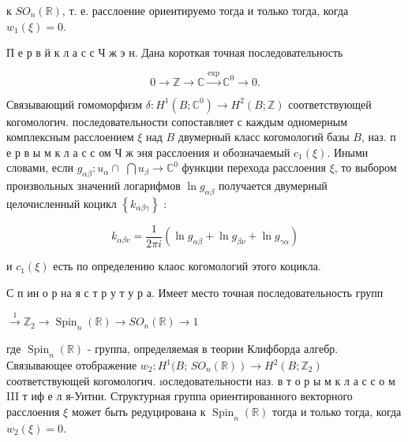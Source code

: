 \documentclass[10pt]{article}
\begin{document}
к $S O_{n}(\mathbb{R})$, т. е. расслоение ориентируемо тогда и только тогда, когда $w_{1}(\xi)=0$.



П е р в й к л а с с Ч ж э н. Дана короткая точная последовательность



\[

0 \longrightarrow \mathbb{Z} \longrightarrow \mathbb{C} \stackrel{\exp }{\longrightarrow} \mathbb{C}^{0} \longrightarrow 0 .

\]



Связывающий гомоморфизм $\delta: H^{1}\left(B ; \mathbb{C}^{0}\right) \rightarrow H^{2}(B ; \mathbb{Z})$ соответствующей когомологич. последовательности сопоставляет с каждым одномерным комплексным расслоением $\xi$ над $B$ двумерный класс когомологий базы $B$, наз. п е р в ы м к л а с с ом Ч ж эня расслоения и обозначаемый $c_{1}(\xi)$. Иными словами, если $g_{\alpha \beta}: u_{\alpha} \cap$ $\bigcap u_{\beta} \longrightarrow \mathbb{C}^{0}$ функции перехода расслоения $\xi$, то выбором произвольных значений логарифмов $\ln g_{\alpha \beta}$ получается двумерный целочисленный коцикл $\left\{k_{\alpha \beta \gamma}\right\}$ :



\[

k_{\alpha \beta v}=\frac{1}{2 \pi i}\left(\ln g_{\alpha \beta}+\ln g_{\beta \nu}+\ln g_{\gamma \alpha}\right)

\]



и $c_{1}(\xi)$ есть по определению клаос когомологий этого коцикла.



С п ин о р на я с т р у т у р а. Имеет место точная последовательность групп



$\stackrel{1}{\longrightarrow} \mathbb{Z}_{2} \longrightarrow \operatorname{Spin}_{n}(\mathbb{R}) \longrightarrow S O_{n}(\mathbb{R}) \longrightarrow 1$



где $\operatorname{Spin}_{n}(\mathbb{R})$ - группа, определяемая в теории Клифборда алгебр. Связывающее отображение $w_{2}: H^{1}(B$; $\left.S O_{n}(\mathbb{R})\right) \longrightarrow H^{2}\left(B ; \mathbb{Z}_{2}\right)$ соответствующей когомологич. ıоследовательности наз. в т о р ы м к л а с с о м III т иф е л я-Уитни. Структурная группа ориентированного векторного расслоения $\xi$ может быть редуцирована к $\operatorname{Spin}_{n}(\mathbb{R})$ тогда и только тогда, когда $w_{2}(\xi)=0$.
\end{document}
